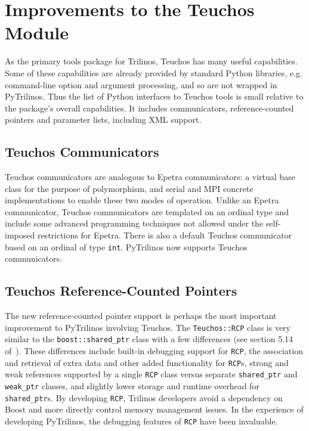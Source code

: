 \documentclass[11pt]{article}
\begin{document}
\section{Improvements to the Teuchos Module}
\label{sec:teuchos}

As the primary tools package for Trilinos, Teuchos has many useful capabilities.  Some of these capabilities are already provided by standard Python libraries, e.g. command-line option and argument processing, and so are not wrapped in PyTrilinos.  Thus the list of Python interfaces to Teuchos tools is small relative to the package's overall capabilities.  It includes communicators, reference-counted pointers and parameter lists, including XML support.

\subsection{Teuchos Communicators}
\label{sec:teuchos_communicators}

Teuchos communicators are analogous to Epetra communicators: a virtual base class for the purpose of polymorphism, and serial and MPI concrete implementations to enable these two modes of operation.  Unlike an Epetra communicator, Teuchos communicators are templated on an ordinal type and include some advanced programming techniques not allowed under the self-imposed restrictions for Epetra.  There is also a default Teuchos communicator based on an ordinal of type {\tt int}.  PyTrilinos now supports Teuchos communicators.

\subsection{Teuchos Reference-Counted Pointers}
\label{sec:teuchos_rcp}

The new reference-counted pointer support is perhaps the most important improvement to PyTrilinos involving Teuchos.  The {\tt Teuchos::RCP} class is very similar to the {\tt boost::shared\_ptr} class with a few differences (see section 5.14 of~\cite{TeuchosMemMgt}).  These differences include built-in debugging support for {\tt RCP}, the association and retrieval of extra data and other added functionality for {\tt RCP}s, strong and weak references supported by a single {\tt RCP} class versus separate {\tt shared\_ptr} and {\tt weak\_ptr} classes, and slightly lower storage and runtime overhead for {\tt shared\_ptr}s. By developing {\tt RCP}, Trilinos developers avoid a dependency on Boost and more directly control memory management issues.  In the experience of developing PyTrilinos, the debugging features of {\tt RCP} have been invaluable.
\end{document}
